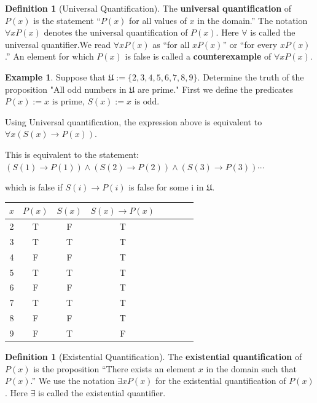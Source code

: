 \documentclass[letterpaper,10pt]{article}
\theoremstyle{plain}
\theoremstyle{definition}
\newtheorem{defn}[thm]{Definition}
\newtheorem{exmp}[thm]{Example}
\theoremstyle{remark}
\providecommand{\land}{\ensuremath{\wedge}}
\begin{document}
\begin{defn}[Universal Quantification]
The \textbf{universal quantification} of $P(x)$ is the statement
“$P(x)$ for all values of $x$ in the domain.”
The notation $\forall x P(x)$ denotes the universal quantification of $P(x)$. Here $\forall$ is called the
universal quantifier.We read $\forall xP(x)$ as “for all $x P(x)$” or “for every  $xP(x)$.” An element
for which $P(x)$ is false is called a \textbf{counterexample} of $ \forall xP(x)$.
\end{defn}
\begin{exmp}

Suppose that $\mathfrak{U}:= \{2,3,4,5,6,7,8,9\}$.
Determine the truth of the proposition "All odd numbers in $\mathfrak{U}$ are prime." 
First we define the predicates
$P(x):=\text{$x$ is prime}$, 
$S(x):= \text{$x$ is odd}$.

Using Universal quantification, the expression above is equivalent to $\forall x (S(x)\to P(x))$.

This is equivalent to the statement:
$(S(1) \to P(1)) \land (S(2) \to P(2)) \land (S(3) \to P(3)) \cdots$

which is false if $S(i)\to P(i)$ is false for some i in $\mathfrak{U}$.

\begin{center} 
\begin{tabular}{ | c | c | c |c |c |c |c |c |} 
  \hline
 $x$& $P(x)$ & $S(x)$ & $S(x) \to P(x)$ \\
 \hline
  2 & T & F& T\\ 
  3 & T & T & T\\ 
  4 & F & F & T\\ 
  5 & T & T & T\\ 
  6 & F & F & T\\ 
  7 & T & T & T\\ 
  8 & F & F & T\\ 
  9 & F & T & F\\ 
  \hline
\end{tabular}

\end{center}

\vspace{2cm}
\end{exmp}
\begin{defn}[Existential Quantification]
The \textbf{existential quantification} of $P(x)$ is the proposition
“There exists an element $x$ in the domain such that $P(x)$.”
We use the notation $\exists xP(x)$ for the existential quantification of $P(x)$. Here $\exists$ is called the
existential quantifier.
\end{defn}
\end{document}
